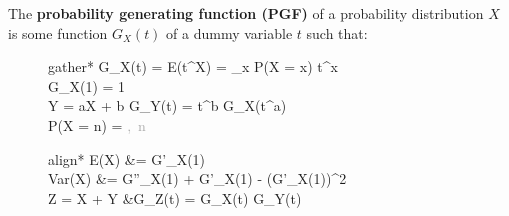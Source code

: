 \documentclass[../main.tex]{subfile}
\begin{document}

The \textbf{probability generating function (PGF)} of a probability distribution $X$ is some function $G_X(t)$ of a dummy variable $t$ such that:
\begin{figure}[H]
	\large
	\begin{minipage}{0.48\linewidth}
		\begin{empheq}[box=\rememberBox]{gather*}
			G_X(t) = E\left(t^X\right) = \sum_x P(X = x) t^x\\[1.2ex]
			G_X(1) = 1\\[1.5ex]
			Y = aX + b \implies G_Y(t) = t^b G_X\left(t^a\right)\\[1.5ex]
			P(X = n) =  \textcolor{darkgray}{,\ n \in {}}
		\end{empheq}
	\end{minipage}\hfill
	\begin{minipage}{0.48\linewidth}
		\begin{empheq}[box=\formulaBookBox]{align*}
			{\rm E}(X) &= G'_X(1)\\
			{\rm Var}(X) &= G''_X(1) + G'_X(1) - (G'_X(1))^2\\
			Z = X + Y &\implies G_Z(t) = G_X(t) \times G_Y(t)
		\end{empheq}
	\end{minipage}
\end{figure}
\end{document}
